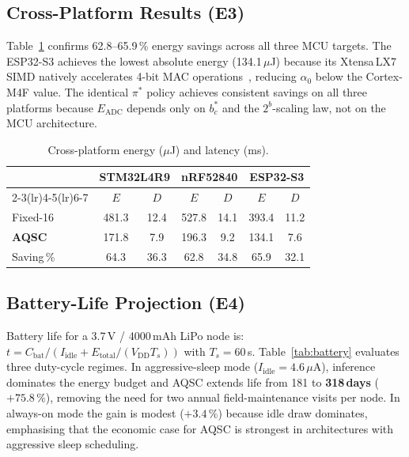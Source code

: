 \documentclass[12pt,a4paper]{article}
\begin{document}
\subsection{Cross-Platform Results (E3)}
\label{sec:crossplat}

Table~\ref{tab:crossplat} confirms 62.8--65.9\,\% energy savings
across all three MCU targets.
The ESP32-S3 achieves the lowest absolute energy (134.1\,$\mu$J)
because its Xtensa\,LX7 SIMD natively accelerates 4-bit MAC
operations~\cite{banbury2021mlperf}, reducing $\alpha_0$ below the
Cortex-M4F value.
The identical $\pi^*$ policy achieves consistent savings on all
three platforms because $E_\mathrm{ADC}$ depends only on $b_c^*$ and
the $2^b$-scaling law, not on the MCU architecture.

\begin{table}[ht]
\centering
\caption{Cross-platform energy ($\mu$J) and latency (ms).}
\label{tab:crossplat}
\setlength{\tabcolsep}{4pt}
\begin{tabular}{@{}lcccccc@{}}
\toprule
 & \multicolumn{2}{c}{\textbf{STM32L4R9}} &
   \multicolumn{2}{c}{\textbf{nRF52840}} &
   \multicolumn{2}{c}{\textbf{ESP32-S3}} \\
\cmidrule(lr){2-3}\cmidrule(lr){4-5}\cmidrule(lr){6-7}
 & $E$ & $D$ & $E$ & $D$ & $E$ & $D$ \\
\midrule
Fixed-16      & 481.3 & 12.4 & 527.8 & 14.1 & 393.4 & 11.2 \\
\textbf{AQSC} & 171.8 &  7.9 & 196.3 &  9.2 & 134.1 &  7.6 \\
Saving\,\%    &  64.3 & 36.3 &  62.8 & 34.8 &  65.9 & 32.1 \\
\bottomrule
\end{tabular}
\end{table}

\subsection{Battery-Life Projection (E4)}
\label{sec:battery}

Battery life for a 3.7\,V / 4000\,mAh LiPo node is:
$t = C_\mathrm{bat}/(I_\mathrm{idle}+E_\mathrm{total}/(V_\mathrm{DD}T_s))$
with $T_s=60$\,s.
Table~\ref{tab:battery} evaluates three duty-cycle regimes.
In aggressive-sleep mode ($I_\mathrm{idle}=4.6\,\mu$A), inference
dominates the energy budget and AQSC extends life from 181 to
\textbf{318\,days} ($+75.8\,\%$), removing the need for two annual
field-maintenance visits per node.
In always-on mode the gain is modest ($+3.4\,\%$) because idle
draw dominates, emphasising that the economic case for AQSC is
strongest in architectures with aggressive sleep scheduling.
\end{document}
